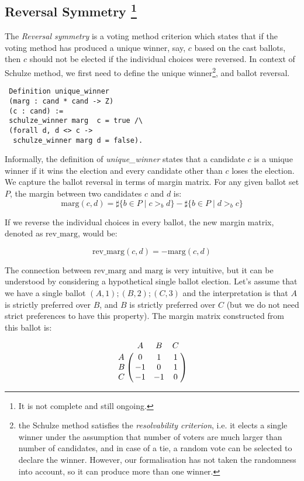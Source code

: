 \documentclass[compsoc,conference,a4paper,10pt,times]{IEEEtran}
\begin{document}
\subsection{Reversal Symmetry \footnote{It is not complete and still ongoing.}}
 The \textit{Reversal symmetry} is a voting method criterion which states that if the
 voting method has produced a unique 
  winner, say, $c$ based on the cast ballots, then $c$ should not be elected if the 
 individual choices were reversed. 
 In context of Schulze method, we first need to define the unique winner\footnote{
 the Schulze method satisfies the 
 \textit{resolvability criterion}, i.e. it elects a single winner under the 
 assumption that number of voters are much larger than
 number of candidates, and in case of a tie,
 a random vote can be selected to declare the winner.  However, our 
 formalisation has not taken the randomness into account, so it can 
 produce more than one winner.}, and ballot reversal. 
 
 \begin{verbatim}
 Definition unique_winner 
 (marg : cand * cand -> Z) 
 (c : cand) :=
 schulze_winner marg  c = true /\
 (forall d, d <> c -> 
  schulze_winner marg d = false).
\end{verbatim}  
\noindent
Informally, the definition of \textit{unique\_winner} states that a 
candidate $c$ is a unique winner
if it wins the election and every candidate 
other than $c$ loses the election.
We capture the ballot reversal in terms of margin matrix. For any given ballot set $P$, 
the margin between two candidates $c$ and $d$ is: 
\[
  \mathrm{marg}(c, d) = \sharp \lbrace b \in P \mid c >_b d \rbrace -
            \sharp \lbrace b \in P \mid d >_b c \rbrace
\] 

\noindent
If we reverse the individual choices in every ballot, the new margin matrix, denoted as $\mathrm{rev\_marg}$, would be:

\[
  \mathrm{rev\_marg}(c, d) = -  \mathrm{marg} (c, d)  
\]      

\noindent
The connection between $\mathrm{rev\_marg}$ and $\mathrm{marg}$ is very intuitive, but it can be understood 
by considering a hypothetical single ballot election. Let's assume that we have 
a single ballot $(A, 1); (B, 2); (C, 3)$ and the interpretation is 
that $A$ is strictly preferred over $B$, and $B$ is strictly preferred over $C$ 
(but we do not need strict preferences to have this property).  The margin matrix
constructed from this ballot is: 

\[
\bordermatrix{ & A & B & C \cr
      A & 0 & 1 & 1 \cr
      B & -1 & 0 & 1 \cr
      C & -1 & -1 & 0 }
      \]
    
\end{document}
